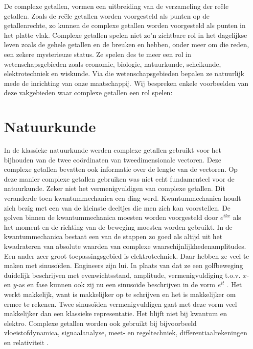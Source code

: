 \documentclass[11pt,fleqn]{book} %
\begin{document}
De complexe getallen, vormen een uitbreiding van de verzameling der reële getallen. Zoals de reële getallen worden voorgesteld als punten op de getallenrechte, zo kunnen de complexe getallen worden voorgesteld als punten in het platte vlak. Complexe getallen spelen niet zo’n zichtbare rol in het dagelijkse leven zoals de gehele getallen en de breuken en hebben, onder meer om die reden, een zekere mysterieuze status. Ze spelen des te meer een rol in wetenschapsgebieden zoals economie, biologie, natuurkunde, scheikunde, elektrotechniek en wiskunde. Via die wetenschapsgebieden bepalen ze natuurlijk mede de inrichting van onze maatschappij. Wij bespreken enkele voorbeelden van deze vakgebieden waar complexe getallen een rol spelen:

\section{Natuurkunde}
In de klassieke natuurkunde werden complexe getallen gebruikt voor het bijhouden van de twee coördinaten van tweedimensionale vectoren. Deze complexe getallen bevatten ook informatie over de lengte van de vectoren. Op deze manier complexe getallen gebruiken was niet echt fundamenteel voor de natuurkunde. Zeker niet het vermenigvuldigen van complexe getallen.
Dit veranderde toen kwantummechanica een ding werd. Kwantummechanica houdt zich bezig met een van de kleinste deeltjes die men zich kan voorstellen. De golven binnen de kwantummechanica moesten worden voorgesteld door $e^{ikx}$ \cite{motl} als het moment en de richting van de beweging moesten worden gebruikt. In de kwantummechanica bestaat een van de stappen zo goed als altijd uit het kwadrateren van absolute waarden van complexe waarschijnlijkhedenamplitudes.
Een ander zeer groot toepassingsgebied is elektrotechniek. Daar hebben ze veel te maken met sinusoïden. Engineers zijn lui. In plaats van dat ze een golfbeweging duidelijk beschrijven met evenwichtsstand, amplitude, vermenigvuldiging t.o.v. $x$- en $y$-as en fase kunnen ook zij nu een sinusoïde beschrijven in de vorm $e^{it}$ \cite{harish}. Het werkt makkelijk, want is makkelijker op te schrijven en het is makkelijker om ermee te rekenen. Twee sinusoïden vermenigvuldigen gaat met deze vorm veel makkelijker dan een klassieke representatie.
Het blijft niet bij kwantum en elektro. Complexe getallen worden ook gebruikt bij bijvoorbeeld vloeistofdynamica, signaalanalyse, meet- en regeltechniek, differentiaalrekeningen en relativiteit \cite{complex_numbers}.
\end{document}
